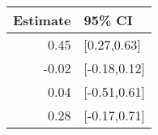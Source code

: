 \begin{tabular}{rl}
  \hline
Estimate & 95\% CI \\ 
  \hline
0.45 & [0.27,0.63] \\ 
  -0.02 & [-0.18,0.12] \\ 
  0.04 & [-0.51,0.61] \\ 
  0.28 & [-0.17,0.71] \\ 
   \hline
\end{tabular}

